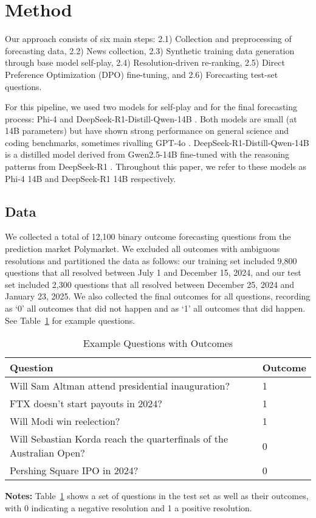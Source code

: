 \documentclass{article}
\begin{document}
\section{Method}

Our approach consists of six main steps: 2.1) Collection and preprocessing of forecasting data, 2.2) News collection, 2.3) Synthetic training data generation through base model self-play, 2.4) Resolution-driven re-ranking, 2.5) Direct Preference Optimization (DPO) fine-tuning, and 2.6) Forecasting test-set questions.

For this pipeline, we used two models for self-play and for the final forecasting process: Phi-4 \citep{Abdin2024} and DeepSeek-R1-Distill-Qwen-14B \citep{Guo2025}. Both models are small (at 14B parameters) but have shown strong performance on general science and coding benchmarks, sometimes rivalling GPT-4o \citep{Rein2023,Hendrycks2021,Guo2025}. DeepSeek-R1-Distill-Qwen-14B is a distilled model derived from Gwen2.5-14B \citep{Yang2024} fine-tuned with the reasoning patterns from DeepSeek-R1 \citep{Guo2025}. Throughout this paper, we refer to these models as Phi-4 14B and DeepSeek-R1 14B respectively.

\subsection{Data}

We collected a total of 12,100 binary outcome forecasting questions from the prediction market Polymarket. We excluded all outcomes with ambiguous resolutions and partitioned the data as follows: our training set included 9,800 questions that all resolved between July 1 and December 15, 2024, and our test set included 2,300 questions that all resolved between December 25, 2024 and January 23, 2025. We also collected the final outcomes for all questions, recording as ‘0’ all outcomes that did not happen and as ‘1’ all outcomes that did happen. See Table~\ref{tab:example} for example questions.

\begin{table}[htbp]
  \centering
  \caption{Example Questions with Outcomes}
  \label{tab:example}
  \begin{tabular}{ll}
    \toprule
    \textbf{Question} & \textbf{Outcome} \\
    \midrule
    Will Sam Altman attend presidential inauguration? & 1 \\
    FTX doesn't start payouts in 2024? & 1 \\
    Will Modi win reelection? & 1 \\
    Will Sebastian Korda reach the quarterfinals of the Australian Open? & 0 \\
    Pershing Square IPO in 2024? & 0 \\
    \bottomrule
  \end{tabular}
  
  \vspace{1ex}
  \textbf{Notes:} Table~\ref{tab:example} shows a set of questions in the test set as well as their outcomes, with 0 indicating a negative resolution and 1 a positive resolution.
\end{table}
\end{document}
